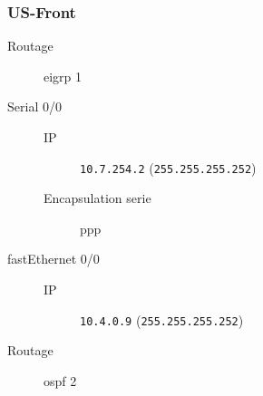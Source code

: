 \subsubsection{US-Front}

	\begin{description}
		\item[Routage] eigrp 1
		\item[Serial 0/0] 
		\begin{description}
			\item[IP] \texttt{10.7.254.2} (\texttt{255.255.255.252})
			\item[Encapsulation serie] ppp
		\end{description}

		\item[fastEthernet 0/0] 
		\begin{description}
			\item[IP] \texttt{10.4.0.9} (\texttt{255.255.255.252})
		\end{description}

		\item[Routage] ospf 2
	\end{description}
